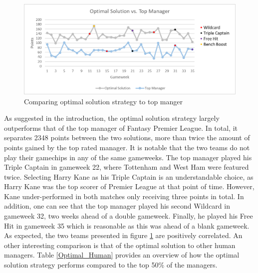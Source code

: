 \begin{figure}[H]
\label{fig:Top_Manager}
    \centering
    \includegraphics[scale=0.75]{fig/chapter_7/Optimal_vs_Top_colour.png}
    \caption{Comparing optimal solution strategy to top manger}
\label{Top_Manager}    
\end{figure}

As suggested in the introduction, the optimal solution strategy largely outperforms that of the top manager of Fantasy Premier League. In total, it separates 2348 points between the two solutions, more than twice the amount of points gained by the top rated manager. It is notable that the two teams do not play their gamechips in any of the same gameweeks. The top manager played his Triple Captain in gameweek 22, where Tottenham and West Ham were featured twice. Selecting Harry Kane as his Triple Captain is an understandable choice, as Harry Kane was the top scorer of Premier League at that point of time. However, Kane under-performed in both matches only receiving three points in total. In addition, one can see that the top manager played his second Wildcard in gameweek 32, two weeks ahead of a double gameweek. Finally, he played his Free Hit in gameweek 35 which is reasonable as this was ahead of a blank gameweek. As expected, the two teams presented in figure \ref{Top_Manager} are positively correlated.   
\newpar
An other interesting comparison is that of the optimal solution to other human managers. Table \ref{Optimal_Human} provides an overview of how the optimal solution strategy performs compared to the top 50\% of the managers. 

